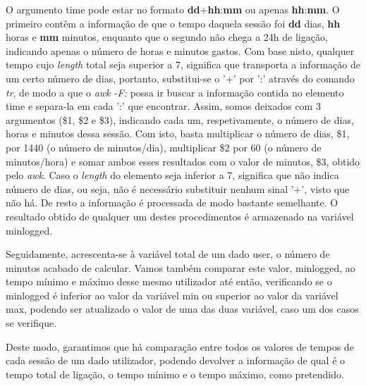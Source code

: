 \documentclass[10pt,portuguese]{article}
\begin{document}
\par O argumento time pode estar no formato \textbf{dd}+\textbf{hh}:\textbf{mm} ou apenas \textbf{hh}:\textbf{mm}. O primeiro contêm a informação de que o tempo daquela sessão foi \textbf{dd} dias, \textbf{hh} horas e \textbf{mm} minutos, enquanto que o segundo não chega a 24h de ligação, indicando apenas o número de horas e minutos gastos. Com base nisto, qualquer tempo cujo \textit{length} total seja superior a 7, significa que transporta a informação de um certo número de dias, portanto, substitui-se o '+' por ':' através do comando \textit{tr}, de modo a que o \textit{awk -F:} possa ir buscar a informação contida no elemento time e separa-la em cada ':' que encontrar. Assim, somos deixados com 3 argumentos (\$1, \$2 e \$3), indicando cada um, respetivamente, o número de dias, horas e minutos dessa sessão. Com isto, basta multiplicar o número de dias, \$1, por 1440 (o número de minutos/dia), multiplicar \$2 por 60 (o número de minutos/hora) e somar ambos esses resultados com o valor de minutos, \$3, obtido pelo \textit{awk}. Caso o \textit{length} do elemento seja inferior a 7, significa que não indica número de dias, ou seja, não é necessário substituir nenhum sinal '+', visto que não há. De resto a informação é processada de modo bastante semelhante. O resultado obtido de qualquer um destes procedimentos é armazenado na variável minlogged. 
\par Seguidamente, acrescenta-se à variável total de um dado user, o número de minutos acabado de calcular. Vamos também comparar este valor, minlogged, ao tempo mínimo e máximo desse mesmo utilizador até então, verificando se o minlogged é inferior ao valor da variável min ou superior ao valor da variável max, podendo ser atualizado o valor de uma das duas variável, caso um dos casos se verifique.
\par Deste modo, garantimos que há comparação entre todos os valores de tempos de cada sessão de um dado utilizador, podendo devolver a informação de qual é o tempo total de ligação, o tempo mínimo e o tempo máximo, como pretendido.
\clearpage
\end{document}
